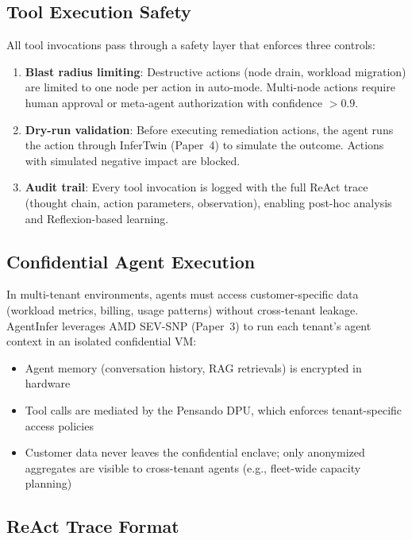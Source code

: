 \documentclass[conference,10pt,letterpaper]{IEEEtran}
\begin{document}
\subsection{Tool Execution Safety}

All tool invocations pass through a safety layer that enforces three controls:

\begin{enumerate}
\item \textbf{Blast radius limiting}: Destructive actions (node drain, workload migration) are limited to one node per action in auto-mode. Multi-node actions require human approval or meta-agent authorization with confidence $> 0.9$.
\item \textbf{Dry-run validation}: Before executing remediation actions, the agent runs the action through InferTwin (Paper~4) to simulate the outcome. Actions with simulated negative impact are blocked.
\item \textbf{Audit trail}: Every tool invocation is logged with the full ReAct trace (thought chain, action parameters, observation), enabling post-hoc analysis and Reflexion-based learning.
\end{enumerate}

\subsection{Confidential Agent Execution}

In multi-tenant environments, agents must access customer-specific data (workload metrics, billing, usage patterns) without cross-tenant leakage. AgentInfer leverages AMD SEV-SNP (Paper~3) to run each tenant's agent context in an isolated confidential VM:

\begin{itemize}
\item Agent memory (conversation history, RAG retrievals) is encrypted in hardware
\item Tool calls are mediated by the Pensando DPU, which enforces tenant-specific access policies
\item Customer data never leaves the confidential enclave; only anonymized aggregates are visible to cross-tenant agents (e.g., fleet-wide capacity planning)
\end{itemize}





\subsection{ReAct Trace Format}
\end{document}
